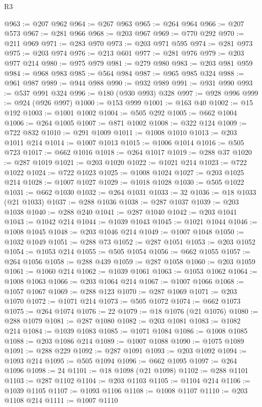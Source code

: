 \begin{lexlean}{R3}
\begin{coremodule}
@963 := @207 @962
@964 := @267 @963
@965 := @264 @964
@966 := @207 @573
@967 := @281 @966
@968 := @203 @967
@969 := @770 @292
@970 := @211 @969
@971 := @283 @970
@973 := @203 @971 @595
@974 := @281 @973
@975 := @203 @974
@976 := @213 @601
@977 := @281 @976
@979 := @203 @977 @214
@980 := @975 @979
@981 := @279 @980
@983 := @203 @981 @959
@984 := @968 @983
@985 := @564 @984
@987 := @965 @985 @324
@988 := @961 @987
@989 := @944 @988
@990 := @932 @989
@991 := @931 @990
@993 := @537 @991 @324
@996 := @180 (@930 @993) @328
@997 := @928 @996
@999 := @924 (@926 @997)
@1000 := @153 @999
@1001 := @163 @40
@1002 := @15 @192
@1003 := @1001 @1002
@1004 := @505 @292
@1005 := @662 @1004
@1006 := @264 @1005
@1007 := @871 @1002
@1008 := @322 @124
@1009 := @722 @832
@1010 := @291 @1009
@1011 := @1008 @1010
@1013 := @203 @1011 @214
@1014 := @1007 @1013
@1015 := @1006 @1014
@1016 := @505 @723
@1017 := @662 @1016
@1018 := @264 @1017
@1019 := @288 @37
@1020 := @287 @1019
@1021 := @203 @1020
@1022 := @1021 @214
@1023 := @722 @1022
@1024 := @722 @1023
@1025 := @1008 @1024
@1027 := @203 @1025 @214
@1028 := @1007 @1027
@1029 := @1018 @1028
@1030 := @505 @1022
@1031 := @662 @1030
@1032 := @264 @1031
@1033 := 32
@1036 := @18 @1033 (@21 @1033)
@1037 := @288 @1036
@1038 := @287 @1037
@1039 := @203 @1038
@1040 := @288 @240
@1041 := @287 @1040
@1042 := @203 @1041
@1043 := @1042 @214
@1044 := @1039 @1043
@1045 := @1021 @1044
@1046 := @1008 @1045
@1048 := @203 @1046 @214
@1049 := @1007 @1048
@1050 := @1032 @1049
@1051 := @288 @73
@1052 := @287 @1051
@1053 := @203 @1052
@1054 := @1053 @214
@1055 := @505 @1054
@1056 := @662 @1055
@1057 := @264 @1056
@1058 := @288 @439
@1059 := @287 @1058
@1060 := @203 @1059
@1061 := @1060 @214
@1062 := @1039 @1061
@1063 := @1053 @1062
@1064 := @1008 @1063
@1066 := @203 @1064 @214
@1067 := @1007 @1066
@1068 := @1057 @1067
@1069 := @288 @123
@1070 := @287 @1069
@1071 := @203 @1070
@1072 := @1071 @214
@1073 := @505 @1072
@1074 := @662 @1073
@1075 := @264 @1074
@1076 := 22
@1079 := @18 @1076 (@21 @1076)
@1080 := @288 @1079
@1081 := @287 @1080
@1082 := @203 @1081
@1083 := @1082 @214
@1084 := @1039 @1083
@1085 := @1071 @1084
@1086 := @1008 @1085
@1088 := @203 @1086 @214
@1089 := @1007 @1088
@1090 := @1075 @1089
@1091 := @288 @229
@1092 := @287 @1091
@1093 := @203 @1092
@1094 := @1093 @214
@1095 := @505 @1094
@1096 := @662 @1095
@1097 := @264 @1096
@1098 := 24
@1101 := @18 @1098 (@21 @1098)
@1102 := @288 @1101
@1103 := @287 @1102
@1104 := @203 @1103
@1105 := @1104 @214
@1106 := @1039 @1105
@1107 := @1093 @1106
@1108 := @1008 @1107
@1110 := @203 @1108 @214
@1111 := @1007 @1110

\end{coremodule}
\end{lexlean}
